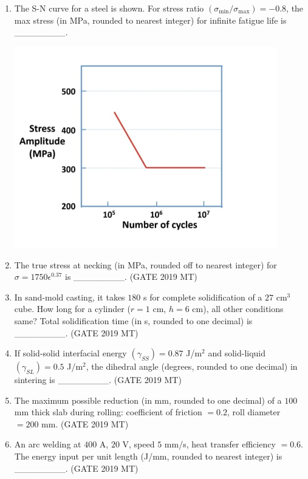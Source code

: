 \documentclass[12pt]{article}
\begin{document}
\begin{enumerate}
\item The S-N curve for a steel is shown. For stress ratio $(\sigma_{\min} / \sigma_{\max}) = -0.8$, the max stress (in MPa, rounded to nearest integer) for infinite fatigue life is ________.
\begin{center}
    \includegraphics[width=0.9\textwidth]{images/qq50i.jpg}
\end{center}

\item The true stress at necking (in MPa, rounded off to nearest integer) for $\sigma = 1750 \epsilon^{0.37}$ is ________. (GATE 2019 MT)

\item In sand-mold casting, it takes $180$ s for complete solidification of a $27$ cm$^3$ cube. How long for a cylinder ($r=1$ cm, $h=6$ cm), all other conditions same? Total solidification time (in s, rounded to one decimal) is ________. (GATE 2019 MT)

\item If solid-solid interfacial energy $(\gamma_{SS}) = 0.87$ J/m$^2$ and solid-liquid $(\gamma_{SL}) = 0.5$ J/m$^2$, the dihedral angle (degrees, rounded to one decimal) in sintering is ________. (GATE 2019 MT)

\item The maximum possible reduction (in mm, rounded to one decimal) of a $100$ mm thick slab during rolling: coefficient of friction $=0.2$, roll diameter $=200$ mm. (GATE 2019 MT)

\item An arc welding at $400$ A, $20$ V, speed $5$ mm/s, heat transfer efficiency $= 0.6$. The energy input per unit length (J/mm, rounded to nearest integer) is ________. (GATE 2019 MT)

\end{enumerate}
\end{document}
